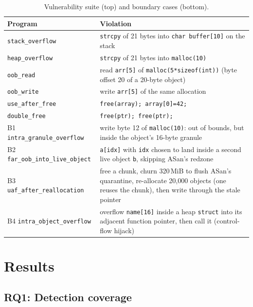 \documentclass[11pt,a4paper]{article}
\newcommand{\cmark}{\textcolor{okc}{\ding{51}}}
\newcommand{\xmark}{\textcolor{badc}{\ding{55}}}
\newcommand{\crash}{\textcolor{crc}{\textbf{!}}}
\begin{document}
\begin{table}[t]
\centering\small
\begin{tabular}{@{}lp{10.6cm}@{}}
\toprule
Program & Violation\\
\midrule
\texttt{stack\_overflow} & \texttt{strcpy} of 21 bytes into \texttt{char buffer[10]} on the stack\\
\texttt{heap\_overflow} & \texttt{strcpy} of 21 bytes into \texttt{malloc(10)}\\
\texttt{oob\_read} & read \texttt{arr[5]} of \texttt{malloc(5*sizeof(int))} (byte offset 20 of a 20-byte object)\\
\texttt{oob\_write} & write \texttt{arr[5]} of the same allocation\\
\texttt{use\_after\_free} & \texttt{free(array); array[0]=42;}\\
\texttt{double\_free} & \texttt{free(ptr); free(ptr);}\\
\midrule
B1 \texttt{intra\_granule\_overflow} & write byte 12 of \texttt{malloc(10)}: out of bounds, but inside the object's 16-byte granule\\
B2 \texttt{far\_oob\_into\_live\_object} & \texttt{a[idx]} with \texttt{idx} chosen to land inside a second live object \texttt{b}, skipping ASan's redzone\\
B3 \texttt{uaf\_after\_reallocation} & free a chunk, churn 320\,MiB to flush ASan's quarantine, re-allocate 20{,}000 objects (one reuses the chunk), then write through the stale pointer\\
B4 \texttt{intra\_object\_overflow} & overflow \texttt{name[16]} inside a heap \texttt{struct} into its adjacent function pointer, then call it (control-flow hijack)\\
\bottomrule
\end{tabular}
\caption{Vulnerability suite (top) and boundary cases (bottom).}
\label{tab:suite}
\end{table}

\section{Results}
\subsection{RQ1: Detection coverage}
\begin{table}[t]
\centering
\resizebox{\textwidth}{!}{\DetectionTable}
\caption{Comparative evaluation matrix (proposal Table~1), filled from 20 runs per cell.
\cmark\ = detected (mechanism), \xmark\ = missed (the program ran to completion), \crash\ = crashed without a report.
A fraction gives the detected runs out of 20 when not all agreed.
For MTE, the left entry is SYNC and the right entry is ASYNC.}
\label{tab:matrix}
\end{table}
\end{document}
